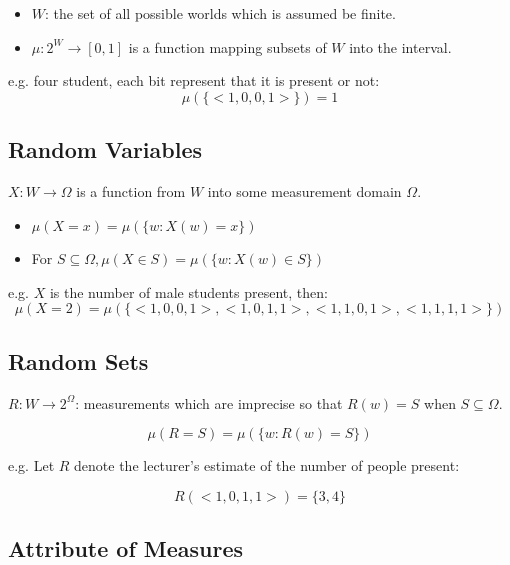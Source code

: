 \documentclass{article}
\begin{document}
\begin{itemize}
    \item $W$: the set of all possible worlds which is assumed be finite.
    \item $\mu: 2^W \rightarrow [0, 1]$ is a function mapping subsets of $W$ into the interval.
\end{itemize}

e.g. four student, each bit represent that it is present or not:
$$\mu(\{<1, 0, 0, 1>\}) = 1$$


\subsection{Random Variables}

$X: W \rightarrow \Omega$ is a function from $W$ into some measurement domain $\Omega$.

\begin{itemize}
    \item $\mu(X=x) = \mu(\{ w: X(w) = x\})$
    \item For $S \subseteq \Omega, \mu(X \in S) = \mu(\{ w: X(w) \in S\})$
\end{itemize}

e.g. $X$ is the number of male students present, then:
$$\mu(X=2) = \mu(\{ <1,0,0,1>, <1,0,1,1>, <1,1,0,1>, <1,1,1,1>\})$$


\subsection{Random Sets}

$R:W \rightarrow 2^{\Omega}$: measurements which are imprecise so that $R(w)=S$ when $S \subseteq \Omega$.

\begin{equation}
    \mu(R=S) = \mu(\{ w: R(w)=S\})
\end{equation}

e.g. Let $R$ denote the lecturer’s estimate of the number of people present: 

$$R(<1,0,1,1>) = \{3, 4\}$$


\subsection{Attribute of Measures}
\end{document}

